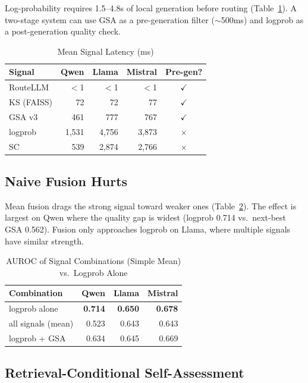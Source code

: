 \documentclass[journal]{IEEEtran}
\begin{document}
Log-probability requires 1.5--4.8s of local generation before routing (Table~\ref{tab:latency}). A two-stage system can use GSA as a pre-generation filter (${\sim}$500ms) and logprob as a post-generation quality check.

\begin{table}[t]
\centering
\caption{Mean Signal Latency (ms)}
\label{tab:latency}
\small
\begin{tabular}{lrrrc}
\toprule
Signal & Qwen & Llama & Mistral & Pre-gen? \\
\midrule
RouteLLM & $<$1 & $<$1 & $<$1 & $\checkmark$ \\
KS (FAISS) & 72 & 72 & 77 & $\checkmark$ \\
GSA v3 & 461 & 777 & 767 & $\checkmark$ \\
logprob & 1,531 & 4,756 & 3,873 & $\times$ \\
SC & 539 & 2,874 & 2,766 & $\times$ \\
\bottomrule
\end{tabular}
\end{table}

\subsection{Naive Fusion Hurts}

Mean fusion drags the strong signal toward weaker ones (Table~\ref{tab:fusion}). The effect is largest on Qwen where the quality gap is widest (logprob 0.714 vs.\ next-best GSA 0.562). Fusion only approaches logprob on Llama, where multiple signals have similar strength.

\begin{table}[t]
\centering
\caption{AUROC of Signal Combinations (Simple Mean) vs.\ Logprob Alone}
\label{tab:fusion}
\begin{tabular}{lrrr}
\toprule
Combination & Qwen & Llama & Mistral \\
\midrule
logprob alone & \textbf{0.714} & \textbf{0.650} & \textbf{0.678} \\
all signals (mean) & 0.523 & 0.643 & 0.643 \\
logprob + GSA & 0.634 & 0.645 & 0.669 \\
\bottomrule
\end{tabular}
\end{table}

\subsection{Retrieval-Conditional Self-Assessment}
\label{sec:retrieval-gsa}
\end{document}
